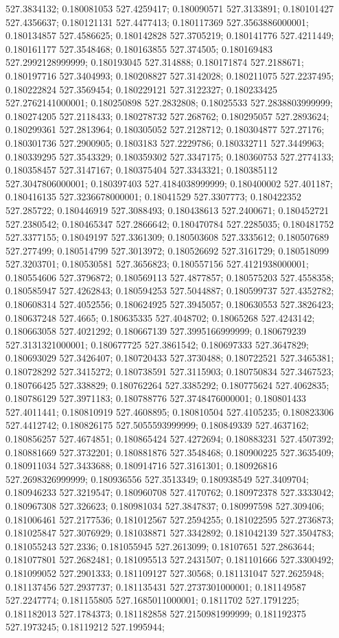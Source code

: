 527.3834132; 0.180081053 527.4259417; 0.180090571 527.3133891; 0.180101427 527.4356637; 0.180121131 527.4477413; 0.180117369 527.3563886000001; 0.180134857 527.4586625; 0.180142828 527.3705219; 0.180141776 527.4211449; 0.180161177 527.3548468; 0.180163855 527.374505; 0.180169483 527.2992128999999; 0.180193045 527.314888; 0.180171874 527.2188671; 0.180197716 527.3404993; 0.180208827 527.3142028; 0.180211075 527.2237495; 0.180222824 527.3569454; 0.180229121 527.3122327; 0.180233425 527.2762141000001; 0.180250898 527.2832808; 0.18025533 527.2838803999999; 0.180274205 527.2118433; 0.180278732 527.268762; 0.180295057 527.2893624; 0.180299361 527.2813964; 0.180305052 527.2128712; 0.180304877 527.27176; 0.180301736 527.2900905; 0.1803183 527.2229786; 0.180332711 527.3449963; 0.180339295 527.3543329; 0.180359302 527.3347175; 0.180360753 527.2774133; 0.180358457 527.3147167; 0.180375404 527.3343321; 0.180385112 527.3047806000001; 0.180397403 527.4184038999999; 0.180400002 527.401187; 0.180416135 527.3236678000001; 0.18041529 527.3307773; 0.180422352 527.285722; 0.180446919 527.3088493; 0.180438613 527.2400671; 0.180452721 527.2380542; 0.180465347 527.2866642; 0.180470784 527.2285035; 0.180481752 527.3377155; 0.18049197 527.3361309; 0.180503608 527.3335612; 0.180507689 527.277499; 0.180514799 527.3013972; 0.180526692 527.3161729; 0.180518099 527.3203701; 0.180530581 527.3656823; 0.180557156 527.4121938000001; 0.180554606 527.3796872; 0.180569113 527.4877857; 0.180575203 527.4558358; 0.180585947 527.4262843; 0.180594253 527.5044887; 0.180599737 527.4352782; 0.180608314 527.4052556; 0.180624925 527.3945057; 0.180630553 527.3826423; 0.180637248 527.4665; 0.180635335 527.4048702; 0.18065268 527.4243142; 0.180663058 527.4021292; 0.180667139 527.3995166999999; 0.180679239 527.3131321000001; 0.180677725 527.3861542; 0.180697333 527.3647829; 0.180693029 527.3426407; 0.180720433 527.3730488; 0.180722521 527.3465381; 0.180728292 527.3415272; 0.180738591 527.3115903; 0.180750834 527.3467523; 0.180766425 527.338829; 0.180762264 527.3385292; 0.180775624 527.4062835; 0.180786129 527.3971183; 0.180788776 527.3748476000001; 0.180801433 527.4011441; 0.180810919 527.4608895; 0.180810504 527.4105235; 0.180823306 527.4412742; 0.180826175 527.5055593999999; 0.180849339 527.4637162; 0.180856257 527.4674851; 0.180865424 527.4272694; 0.180883231 527.4507392; 0.180881669 527.3732201; 0.180881876 527.3548468; 0.180900225 527.3635409; 0.180911034 527.3433688; 0.180914716 527.3161301; 0.180926816 527.2698326999999; 0.180936556 527.3513349; 0.180938549 527.3409704; 0.180946233 527.3219547; 0.180960708 527.4170762; 0.180972378 527.3333042; 0.180967308 527.326623; 0.180981034 527.3847837; 0.180997598 527.309406; 0.181006461 527.2177536; 0.181012567 527.2594255; 0.181022595 527.2736873; 0.181025847 527.3076929; 0.181038871 527.3342892; 0.181042139 527.3504783; 0.181055243 527.2336; 0.181055945 527.2613099; 0.18107651 527.2863644; 0.181077801 527.2682481; 0.181095513 527.2431507; 0.181101666 527.3300492; 0.181099052 527.2901333; 0.181109127 527.30568; 0.181131047 527.2625948; 0.181137456 527.2937737; 0.181135431 527.2737301000001; 0.181149587 527.2247774; 0.181155805 527.1685011000001; 0.1811702 527.1791225; 0.181182013 527.1784373; 0.181182858 527.2150981999999; 0.181192375 527.1973245; 0.18119212 527.1995944; 